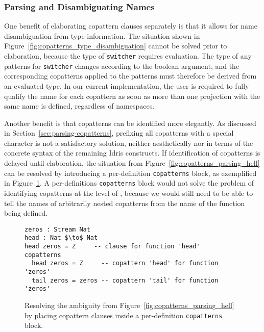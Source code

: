 \subsubsection{Parsing and Disambiguating Names}
\label{sec:pars-disamb-names}
One benefit of elaborating copattern clauses separately is that it
allows for name disambiguation from type information. The situation shown in
Figure~\ref{fig:copatterns_type_disambiguation} cannot be solved prior to
elaboration, because the type of \texttt{switcher} requires evaluation. The type
of any patterns for \texttt{switcher} changes according to the boolean argument,
and the corresponding copatterns applied to the patterns must therefore be
derived from an evaluated type. In our current implementation, the user is required to fully
qualify the name for each copattern as soon as more than one projection with the
same name is defined, regardless of namespaces.

Another benefit is that copatterns can be identified more
elegantly. As discussed in Section~\ref{sec:parsing-copatterns}, prefixing all
copatterns with a special character is not a satisfactory solution, neither
aesthetically nor in terms of the concrete syntax of the remaining Idris
constructs. If identification of copatterns is delayed until elaboration, the
situation from Figure~\ref{fig:copatterns_parsing_hell} can be resolved by
introducing a per-definition \texttt{copatterns} block, as exemplified in
Figure~\ref{fig:copatterns_parsing_hell_fixed_copatterns_block}. A
per-definitions \texttt{copatterns} block would not solve the problem of
identifying copatterns at the level of \IdrisM{}, because we would still need to be able to
tell the names of arbitrarily nested copatterns from the name of the function being
defined.



\begin{figure}
\begin{lstlisting}[mathescape,title=\idrisBlock]
zeros : Stream Nat
head : Nat $\to$ Nat
head zeros = Z     -- clause for function 'head'
copatterns
  head zeros = Z     -- copattern 'head' for function 'zeros'
  tail zeros = zeros -- copattern 'tail' for function 'zeros'
\end{lstlisting}
  \caption{Resolving the ambiguity from Figure~\ref{fig:copatterns_parsing_hell}
  by placing copattern clauses inside a per-definition \texttt{copatterns} block.}
  \label{fig:copatterns_parsing_hell_fixed_copatterns_block}
\end{figure}

